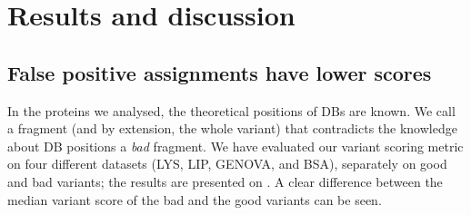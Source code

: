 \chapter{Results and discussion}

\section{False positive assignments have lower scores}

In the proteins we analysed, the theoretical positions of DBs are known. We call a fragment (and by extension, the whole variant) that contradicts the knowledge about DB positions a \emph{bad} fragment. We have evaluated our variant scoring metric on four different datasets (LYS, LIP, GENOVA, and BSA), separately on good and bad variants; the results are presented on . A clear difference between the median variant score of the bad and the good variants can be seen.

